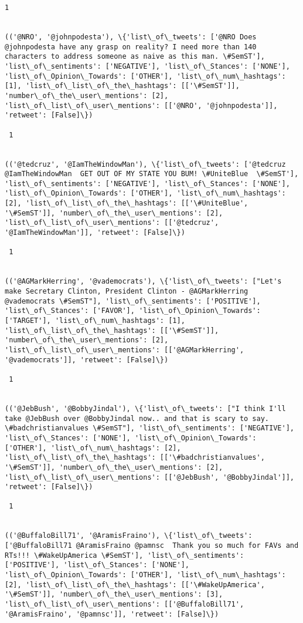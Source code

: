 \documentclass[11pt]{article}
\begin{document}
\begin{Verbatim}[commandchars=\\\{\}]
 1
 

(('@NRO', '@johnpodesta'), \{'list\_of\_tweets': ['@NRO Does @johnpodesta have any grasp on reality? I need more than 140 characters to address someone as naive as this man. \#SemST'], 'list\_of\_sentiments': ['NEGATIVE'], 'list\_of\_Stances': ['NONE'], 'list\_of\_Opinion\_Towards': ['OTHER'], 'list\_of\_num\_hashtags': [1], 'list\_of\_list\_of\_the\_hashtags': [['\#SemST']], 'number\_of\_the\_user\_mentions': [2], 'list\_of\_list\_of\_user\_mentions': [['@NRO', '@johnpodesta']], 'retweet': [False]\})

 1
 

(('@tedcruz', '@IamTheWindowMan'), \{'list\_of\_tweets': ['@tedcruz @IamTheWindowMan  GET OUT OF MY STATE YOU BUM! \#UniteBlue  \#SemST'], 'list\_of\_sentiments': ['NEGATIVE'], 'list\_of\_Stances': ['NONE'], 'list\_of\_Opinion\_Towards': ['OTHER'], 'list\_of\_num\_hashtags': [2], 'list\_of\_list\_of\_the\_hashtags': [['\#UniteBlue', '\#SemST']], 'number\_of\_the\_user\_mentions': [2], 'list\_of\_list\_of\_user\_mentions': [['@tedcruz', '@IamTheWindowMan']], 'retweet': [False]\})

 1
 

(('@AGMarkHerring', '@vademocrats'), \{'list\_of\_tweets': ["Let's make Secretary Clinton, President Clinton - @AGMarkHerring @vademocrats \#SemST"], 'list\_of\_sentiments': ['POSITIVE'], 'list\_of\_Stances': ['FAVOR'], 'list\_of\_Opinion\_Towards': ['TARGET'], 'list\_of\_num\_hashtags': [1], 'list\_of\_list\_of\_the\_hashtags': [['\#SemST']], 'number\_of\_the\_user\_mentions': [2], 'list\_of\_list\_of\_user\_mentions': [['@AGMarkHerring', '@vademocrats']], 'retweet': [False]\})

 1
 

(('@JebBush', '@BobbyJindal'), \{'list\_of\_tweets': ["I think I'll take @JebBush over @BobbyJindal now.. and that is scary to say.  \#badchristianvalues \#SemST"], 'list\_of\_sentiments': ['NEGATIVE'], 'list\_of\_Stances': ['NONE'], 'list\_of\_Opinion\_Towards': ['OTHER'], 'list\_of\_num\_hashtags': [2], 'list\_of\_list\_of\_the\_hashtags': [['\#badchristianvalues', '\#SemST']], 'number\_of\_the\_user\_mentions': [2], 'list\_of\_list\_of\_user\_mentions': [['@JebBush', '@BobbyJindal']], 'retweet': [False]\})

 1
 

(('@BuffaloBill71', '@AramisFraino'), \{'list\_of\_tweets': ['@BuffaloBill71 @AramisFraino @pamnsc  Thank you so much for FAVs and RTs!!! \#WakeUpAmerica \#SemST'], 'list\_of\_sentiments': ['POSITIVE'], 'list\_of\_Stances': ['NONE'], 'list\_of\_Opinion\_Towards': ['OTHER'], 'list\_of\_num\_hashtags': [2], 'list\_of\_list\_of\_the\_hashtags': [['\#WakeUpAmerica', '\#SemST']], 'number\_of\_the\_user\_mentions': [3], 'list\_of\_list\_of\_user\_mentions': [['@BuffaloBill71', '@AramisFraino', '@pamnsc']], 'retweet': [False]\})


\end{Verbatim}
\end{document}

